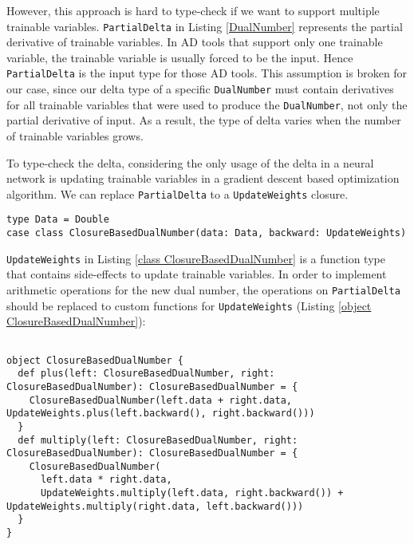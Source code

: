 However, this approach is hard to type-check if we want to support multiple  \glspl{trainable variable}. \lstinline{PartialDelta} in Listing \ref{DualNumber} represents the partial derivative of \glspl{trainable variable}. In AD tools that support only one \gls{trainable variable}, the \gls{trainable variable} is usually forced to be the input. Hence \lstinline{PartialDelta} is the input type for those AD tools. This assumption is broken for our case, since our delta type of a specific \lstinline{DualNumber} must contain derivatives for all \glspl{trainable variable} that were used to produce the \lstinline{DualNumber}, not only the partial derivative of input. As a result, the type of delta varies when the number of \glspl{trainable variable} grows.

To type-check the delta, considering the only usage of the delta in a neural network is updating \glspl{trainable variable} in a gradient descent based optimization algorithm. We can replace \lstinline{PartialDelta} to a \lstinline{UpdateWeights} closure.

\begin{lstlisting}[float={htbp},caption={Replacing \lstinline{PartialDelta} to a closure}, label={class ClosureBasedDualNumber}]
type Data = Double  
case class ClosureBasedDualNumber(data: Data, backward: UpdateWeights)
\end{lstlisting}

\lstinline{UpdateWeights} in Listing \ref{class ClosureBasedDualNumber} is a function type that contains side-effects to update \glspl{trainable variable}. In order to implement arithmetic operations for the new dual number, the operations on \lstinline{PartialDelta} should be replaced to custom functions for \lstinline{UpdateWeights} (Listing \ref{object ClosureBasedDualNumber}):

\begin{lstlisting}[float={htbp},caption={Replacing operations on \lstinline{PartialDelta} to custom functions for \lstinline{UpdateWeights}}, label={object ClosureBasedDualNumber}]  

object ClosureBasedDualNumber {
  def plus(left: ClosureBasedDualNumber, right: ClosureBasedDualNumber): ClosureBasedDualNumber = {
    ClosureBasedDualNumber(left.data + right.data, UpdateWeights.plus(left.backward(), right.backward()))
  }
  def multiply(left: ClosureBasedDualNumber, right: ClosureBasedDualNumber): ClosureBasedDualNumber = {
    ClosureBasedDualNumber(
      left.data * right.data,
      UpdateWeights.multiply(left.data, right.backward()) + UpdateWeights.multiply(right.data, left.backward()))
  }
}
\end{lstlisting}


